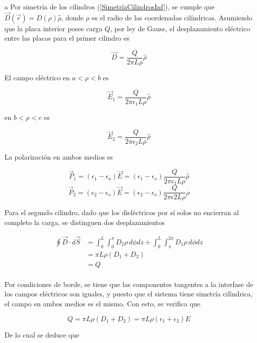 \begin{solucion}{11}

\ics a
Por simetría de los cilindros (\ref{SimetríaCilindrosInf}), se cumple que $\Vec{D}(\Vec{r})=D(\rho)\hat{\rho}$, donde $\rho$ es el radio de las coordenadas cilíndricas. Asumiendo que la placa interior posee carga $Q$, por ley de Gauss, el desplazamiento eléctrico entre las placas para el primer cilindro es

\[\Vec{D}=\frac{Q}{2\pi L\rho}\hat{\rho}\]

El campo eléctrico en $a<\rho<b$ es

\[\Vec{E}_1=\frac{Q}{2\pi\epsilon_1 L\rho}\hat{\rho}\]

en $b<\rho<c$ es

\[\Vec{E}_2=\frac{Q}{2\pi\epsilon_2 L\rho}\hat{\rho}\]

La polarización en ambos medios es

\[\Vec{P}_1 = (\epsilon_1-\epsilon_o)\Vec{E} =
(\epsilon_1-\epsilon_o)\frac{Q}{2\pi\epsilon_1 L\rho}\hat{\rho}\]
\[\Vec{P}_2 = (\epsilon_2-\epsilon_o)\Vec{E} =
(\epsilon_2-\epsilon_o)\frac{Q}{2\pi\epsilon2 L\rho}\hat{\rho}\]

Para el segundo cilindro, dado que los dieléctricos por sí solos no encierran al completo la carga, se distinguen dos desplazamientos

\begin{equation}
\begin{split}
    \oint\Vec{D}\cdot d\Vec{S}&=\int^L_0\int^\pi_0D_2\rho\,
    d\phi dz + \int^L_0\int^{2\pi}_\pi D_1\rho\,d\phi dz\\
    &= \pi L\rho(D_1+D_2)\\
    &= Q\\
\end{split}
\nonumber
\end{equation}

Por condiciones de borde, se tiene que las componentes tangentes a la interfase de los campos eléctricos son iguales, y puesto que el sistema tiene simetría cilíndrica, el campo en ambos medios es el mismo. Con esto, se verifica que

\[Q = \pi L\rho(D_1+D_2) = \pi L\rho(\epsilon_1+\epsilon_2)E\]

De lo cual se deduce que


\end{solucion}
